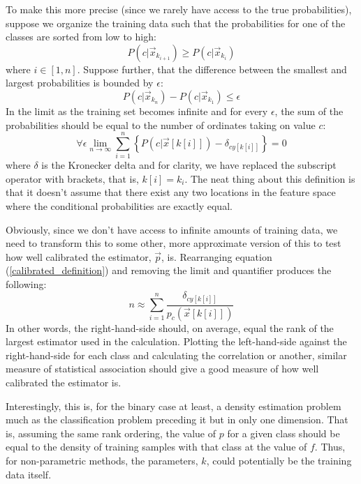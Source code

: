 \documentclass{article}
\newcommand{\binarydecision}{f}
\newcommand{\param}{k}
\newcommand{\estimator}{{p}}
\newcommand{\condprob}{P}
\newcommand{\coord}{x}
\newcommand{\ord}{y}
\newcommand{\bound}{\epsilon}
\begin{document}
To make this more precise (since we rarely have access to the true
probabilities), suppose we organize the training data such that
the probabilities for one of the classes are sorted from low to high:
\begin{equation}
	\condprob(c | \vec \coord_{k_{i+1}}) \ge \condprob(c | \vec \coord_{k_i})
\end{equation}
where $i\in[1, n]$.
Suppose further, that the difference between the smallest and largest
probabilities is bounded by $\bound$:
\begin{equation}
	\condprob(c | \vec \coord_{k_n}) - \condprob (c | \vec \coord_{k_1}) \le \bound
\end{equation}
In the limit as the training set becomes infinite and for every $\bound$,
the sum of the probabilities should be equal to the number of ordinates taking
on value $c$:
\begin{equation}
	\forall \bound \lim_{n \rightarrow \infty} \sum_{i=1}^n \left \lbrace \condprob \left (c | \vec \coord[k[i]] \right ) - \delta_{c\ord[k[i]]} \right \rbrace = 0
	\label{calibrated_definition}
\end{equation}
where $\delta$ is the Kronecker delta and for clarity, we have replaced the
subscript operator with brackets, that is, $k[i]=k_i$.
The neat thing about this definition is that it doesn't assume that there
exist any two locations in the feature space where the conditional
probabilities are exactly equal.

Obviously, since we don't have access to infinite amounts of training data,
we need to transform this to some other, more approximate version of this
to test how well calibrated the estimator, $\vec \estimator$, is.
Rearranging equation (\ref{calibrated_definition}) and removing the limit and
quantifier produces the following:
\begin{equation}
	n \approx \sum_{i=1}^n \frac{\delta_{c\ord[k[i]]}}{\estimator_c\left (\vec \coord[k[i]] \right )}
\end{equation}
In other words, the right-hand-side should, on average, equal the rank of the
largest estimator used in the calculation.
Plotting the left-hand-side against the right-hand-side for each class and
calculating the correlation or another, similar measure of statistical
association should give a good measure of how well calibrated the
estimator is.

Interestingly, this is, for the binary case at least, a density estimation 
problem much as the classification problem preceding it but in only one
dimension.
That is, assuming the same rank ordering, the value of
$\estimator$ for a given class should be equal to the density of training
samples with that class at the value of $\binarydecision$.
Thus, for non-parametric methods, the parameters, $\param$, could potentially
be the training data itself.
\end{document}
